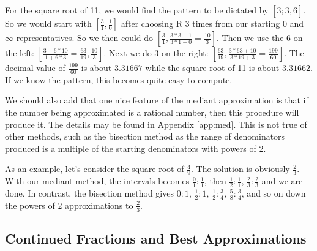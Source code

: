 \documentclass[12pt]{article}
\theoremstyle{remark}
\begin{document}
For the square root of 11, we would find the pattern to be dictated by $[3;\overline{3,6}]$. So we would start with $[\tfrac{3}{1}, \tfrac{1}{0}]$ after choosing R 3 times from our starting 0 and $\infty$ representatives. So we then could do $[\tfrac{3}{1}, \tfrac{3*3 + 1}{3*1 + 0} = \tfrac{10}{3}]$. Then we use the 6 on the left:  $[\tfrac{3+6*10}{1+6*3} = \tfrac{63}{19}, \tfrac{10}{3}]$. Next we do 3 on the right:  $[\tfrac{63}{19}, \tfrac{3*63+10}{3*19+3} = \tfrac{199}{60}]$. The decimal value of $\tfrac{199}{60}$ is about $3.31667$ while the square root of 11 is about $3.31662$. If we know the pattern, this becomes quite easy to compute. 

We should also add that one nice feature of the mediant approximation is that if the number being approximated is a rational number, then this procedure will produce it. The details may be found in Appendix \ref{app:med}. This is not true of other methods, such as the bisection method as the range of denominators produced is a multiple of the starting denominators with powers of 2. 

As an example, let's consider the square root of $\frac{4}{9}$. The solution is obviously $\frac{2}{3}$. With our mediant method, the intervals becomes $\frac{0}{1}:\frac{1}{1}$, then $\frac{1}{2}:\frac{1}{1}$, $\frac{2}{3}:\frac{2}{3}$ and we are done. In contrast, the bisection method gives $0:1$, $\frac{1}{2}:1$, $\frac{1}{2}:\frac{3}{4}$, $\frac{5}{8}:\frac{3}{4}$, and so on down the powers of 2 approximations to $\frac{2}{3}$. 

\subsection{Continued Fractions and Best Approximations}
\end{document}
